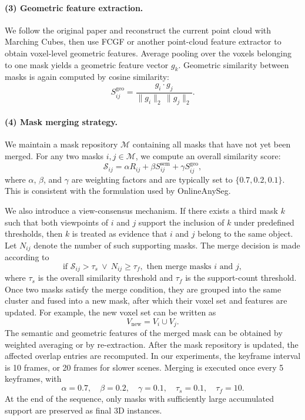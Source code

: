 \documentclass[12pt,a4paper]{article}
\begin{document}
\paragraph{(3) Geometric feature extraction.}
We follow the original paper and reconstruct the current point cloud with Marching Cubes, then use FCGF or another point-cloud feature extractor to obtain voxel-level geometric features. Average pooling over the voxels belonging to one mask yields a geometric feature vector $g_k$. Geometric similarity between masks is again computed by cosine similarity:
\begin{equation}
S^\text{geo}_{ij}=
\frac{g_i\cdot g_j}{\lVert g_i\rVert_2\,\lVert g_j\rVert_2}.
\end{equation}

\paragraph{(4) Mask merging strategy.}
We maintain a mask repository $\mathcal{M}$ containing all masks that have not yet been merged. For any two masks $i,j\in\mathcal{M}$, we compute an overall similarity score:
\begin{equation}
\mathcal{S}_{ij}=\alpha R_{ij}+\beta S^\text{sem}_{ij}+\gamma S^\text{geo}_{ij},
\end{equation}
where $\alpha$, $\beta$, and $\gamma$ are weighting factors and are typically set to $\{0.7, 0.2, 0.1\}$. This is consistent with the formulation used by OnlineAnySeg.

We also introduce a view-consensus mechanism. If there exists a third mask $k$ such that both viewpoints of $i$ and $j$ support the inclusion of $k$ under predefined thresholds, then $k$ is treated as evidence that $i$ and $j$ belong to the same object. Let $N_{ij}$ denote the number of such supporting masks. The merge decision is made according to
\begin{equation}
\text{if } \mathcal{S}_{ij}>\tau_s \ \lor\ N_{ij}\ge \tau_f,
\text{ then merge masks } i \text{ and } j,
\end{equation}
where $\tau_s$ is the overall similarity threshold and $\tau_f$ is the support-count threshold. Once two masks satisfy the merge condition, they are grouped into the same cluster and fused into a new mask, after which their voxel set and features are updated. For example, the new voxel set can be written as
\begin{equation}
V_{\text{new}}=V_i\cup V_j.
\end{equation}
The semantic and geometric features of the merged mask can be obtained by weighted averaging or by re-extraction. After the mask repository is updated, the affected overlap entries are recomputed. In our experiments, the keyframe interval is 10 frames, or 20 frames for slower scenes. Merging is executed once every 5 keyframes, with
\[
\alpha=0.7,\quad \beta=0.2,\quad \gamma=0.1,\quad \tau_s=0.1,\quad \tau_f=10.
\]
At the end of the sequence, only masks with sufficiently large accumulated support are preserved as final 3D instances.
\end{document}
